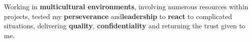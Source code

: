 
Working in \textbf{multicultural environments}, involving numerous
resources within projects, tested my \textbf{perseverance}
and\textbf{leadership} to \textbf{react} to complicated situations,
delivering \textbf{quality}, \textbf{confidentiality} and returning the
trust given to me.

